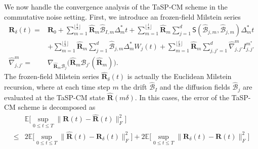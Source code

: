 \documentclass[11pt, a4paper, onecolumn]{article}
\newcommand{\E}{\mathbb{E}}
\renewcommand{\SS}{\mathsf{S}}
\newcommand{\m}{m}
\newcommand{\bfR}{\mathbf{R}}
\newcommand{\B}{\mathcal{B}}
\newcommand{\hatB}{\widehat{\B}}
\newcommand{\hatR}{\widehat{\bfR}}
\newcommand{\ms}{{m^*}}
\newcommand{\hBIms}{{\hatB_{I,\m}}}
\newcommand{\hBjms}{{\hatB_{j,\m}}}
\newcommand{\Dms}{{\Delta^{*}_{m}}}
\newcommand{\hnjjpms}{ {\widehat{\nabla}_{j,j'}^{\m}} }
\newcommand{\Ijjpms}{ {I_{j,j'}^{\ms}} }
\newcommand{\sumub}{{\lfloor \frac{t}{\delta} \rfloor}}
\newcommand{\hRms}{{\hatR_\m}}
\newcommand{\Der}[4]{
  #1_{#2}\bigl(#3(#4)\bigr)
}
\begin{document}
We now handle the convergence analysis of the TaSP-CM scheme in the commutative noise setting. First, we introduce an frozen‑field Milstein series
\begin{align}\label{eq:frozen-mil}
     \bfR_\delta(t) = & \bfR_0 + \sum_{m=1}^{\sumub} \hRms \hBIms \Dms t +  \sum_{m=1}^{\sumub}  \hRms\sum_{j=1}^d  \SS(\hBjms, \hBjms) \Dms t  \\ 
   & + \sum_{m=1}^{\sumub}\hRms\sum_{j=1}^d \hBjms \Dms W_j(t)  + \sum_{m=1}^{\sumub}\hRms\sum_{j,j'=1}^d \hnjjpms \Ijjpms \nonumber \\
    \hnjjpms = & \Der{\nabla}{\hRms\B_j}{\hRms\B_{j'}}{\hatR_m}.  \nonumber
\end{align}
The frozen‑field Milstein series $\hatR_{\delta}(t)$ is actually the Euclidean Milstein recursion, where at each time step $m$ the drift $\hatB_I$ and the diffusion fields $\hatB_j$ are evaluated at the TaSP-CM state $\hatR(m\delta)$.  In this cases, the error of the TaSP-CM scheme is decomposed as
\begin{align*}
        &  \E\big[ \sup_{0 \le t\le T} \| \bfR(t) - \hatR(t) \|^2_F \big] \\ 
    \le & 2\E\big[ \sup_{0 \le t\le T}\| \hatR(t)- \bfR_\delta(t) \|_F^2 \big] + 2\E\big[ \sup_{0 \le t\le T} \|  \bfR_\delta(t) - \bfR(t)\|^2_F \big] 
\end{align*}
\end{document}
